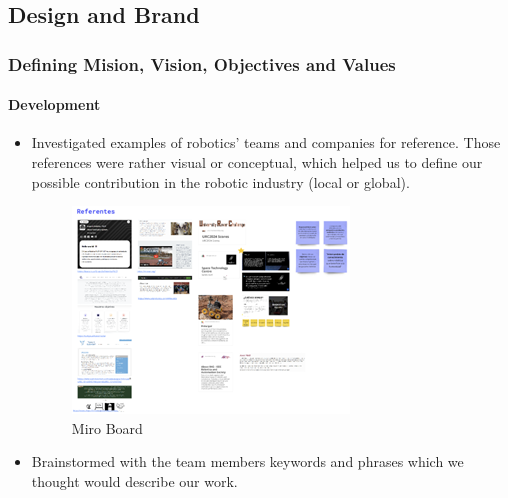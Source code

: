 \documentclass{article}
\begin{document}
\subsection{Design and Brand}
\subsubsection{Defining Mision, Vision, Objectives and Values}
\paragraph{Development}
\begin{itemize}
    \item Investigated examples of robotics’ teams and companies for reference. Those references were rather visual or conceptual, which helped us to define our possible contribution in the robotic industry (local or global).
    \begin{figure}[H]
        \centering
        \includegraphics[width=\linewidth]{Images/Design/Miro1.png}
        \caption{Miro Board}
    \end{figure}
    \item Brainstormed with the team members keywords and phrases which we thought would describe our work. 
    

\end{itemize}
\end{document}
